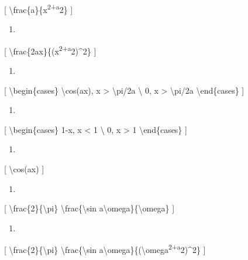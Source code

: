\documentclass[
]{article}
\providecommand{\tightlist}{%
  \setlength{\itemsep}{0pt}\setlength{\parskip}{0pt}}
\begin{document}
{[} \textbackslash frac\{a\}\{x\textsuperscript{2+a}2\} {]}

\begin{enumerate}
\def\labelenumi{\arabic{enumi}.}
\setcounter{enumi}{15}
\tightlist
\item
\end{enumerate}

{[} \textbackslash frac\{2ax\}\{(x\textsuperscript{2+a}2)\^{}2\} {]}

\begin{enumerate}
\def\labelenumi{\arabic{enumi}.}
\setcounter{enumi}{16}
\tightlist
\item
\end{enumerate}

{[} \textbackslash begin\{cases\} \textbackslash cos(ax),
\textbar x\textbar{} \textgreater{} \textbackslash pi/2a
\textbackslash{} 0, \textbar x\textbar{} \textgreater{}
\textbackslash pi/2a \textbackslash end\{cases\} {]}

\begin{enumerate}
\def\labelenumi{\arabic{enumi}.}
\setcounter{enumi}{17}
\tightlist
\item
\end{enumerate}

{[} \textbackslash begin\{cases\} 1-\textbar x\textbar,
\textbar x\textbar{} \textless{} 1 \textbackslash{} 0,
\textbar x\textbar{} \textgreater{} 1 \textbackslash end\{cases\} {]}

\begin{enumerate}
\def\labelenumi{\arabic{enumi}.}
\setcounter{enumi}{18}
\tightlist
\item
\end{enumerate}

{[} \textbackslash cos(ax) {]}

\begin{enumerate}
\def\labelenumi{\arabic{enumi}.}
\setcounter{enumi}{9}
\tightlist
\item
\end{enumerate}

{[} \textbackslash frac\{2\}\{\textbackslash pi\}
\textbackslash frac\{\textbackslash sin
a\textbackslash omega\}\{\textbackslash omega\} {]}

\begin{enumerate}
\def\labelenumi{\arabic{enumi}.}
\setcounter{enumi}{9}
\tightlist
\item
\end{enumerate}

{[} \textbackslash frac\{2\}\{\textbackslash pi\}
\textbackslash frac\{\textbackslash sin
a\textbackslash omega\}\{(\textbackslash omega\textsuperscript{2+a}2)\^{}2\}
{]}
\end{document}
